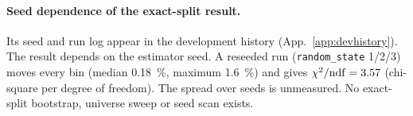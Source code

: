 \paragraph{Seed dependence of the exact-split result.} Its seed and run log appear in the development history (App.~\ref{app:devhistory}). The result depends on the estimator seed. A reseeded run (\texttt{random\_state} 1/2/3) moves every bin (median \SI{0.18}{\percent}, maximum \SI{1.6}{\percent}) and gives $\chi^{2}/\mathrm{ndf}=3.57$ (chi-square per degree of freedom). The spread over seeds is unmeasured. No exact-split bootstrap, universe sweep or seed scan exists.

